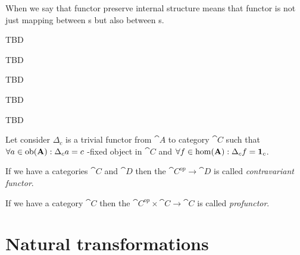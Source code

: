 \begin{remark}[Functor]
When we say that functor preserve internal structure means that
functor is not just mapping between s but also
between s.  
\end{remark}

\begin{definition}
TBD
\end{definition}

\begin{definition}
TBD
\end{definition}

\begin{definition}
TBD
\end{definition}

\begin{definition}
TBD
\end{definition}

\begin{definition}[Bifunctor]
\label{def:bifunctor}
TBD
\end{definition}

\begin{definition}
\label{def:terminal_object_cat}
Let consider $\Delta_c$ is a trivial functor from 
$\cat{A}$ to category $\cat{C}$ such that $\forall a \in \mathrm{ob}(\mathbf{A}):
\Delta_c a = c$ -fixed object in $\cat{C}$ and 
$\forall f \in \mathrm{hom}(\mathbf{A}): \Delta_c f = \mathbf{1}_{c}$.
\end{definition}

\begin{definition}
\label{def:contravariant_functor}
If we have a categories $\cat{C}$ and $\cat{D}$ then the
 $\cat{C^{op}} \to \cat{D}$ is called
\textit{contravariant functor}. 
\end{definition}

\begin{definition}[Profunctor]
\label{def:profunctor}
If we have a category $\cat{C}$ then the 
$\cat{C^{op}} \times \cat{C} \to \cat{C}$ is called
\textit{profunctor}. 
\end{definition}


\section{Natural transformations}

